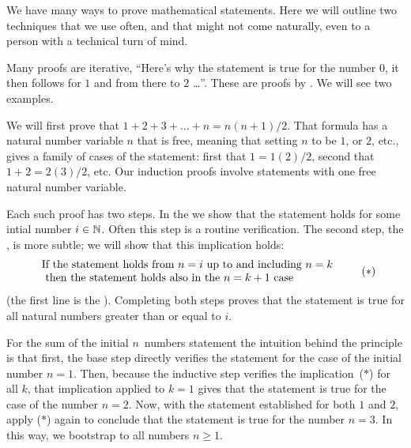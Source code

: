 %
We have many ways to prove mathematical statements.
Here we will outline two techniques that we use often, and that
might not come naturally, even to a person with a technical 
turn of mind.
 

Many proofs are iterative,
``Here's why the statement is true for the number \( 0 \), 
it then follows for \( 1 \) and from there to \( 2 \) \ldots''.
These are proofs by 
.
We will see two examples.

We will first prove that \( 1+2+3+\dots+n=n(n+1)/2 \). 
That formula has a natural number variable $n$
that is free, meaning that setting $n$ to be $1$,
or $2$, etc., gives a family of cases of the statement:
first that $1=1(2)/2$, second that $1+2=2(3)/2$, etc.
Our induction proofs involve statements with one free natural number 
variable.

Each such proof has two steps. 
In the 
we show that the statement holds for
some intial number $i\in \mathbb{N}$. 
Often this step is a routine verification.
The second step, 
the ,
is more subtle; we will show that this implication holds:
\begin{equation*}
  \begin{tabular}{l}
    \text{If the statement holds from $n=i$ up to and including~$n=k$} 
     \\
    \text{\ then the statement holds also in the $n=k+1$ case}
  \end{tabular}
  \tag{$*$}
\end{equation*}
(the first line is the 
).
Completing both steps proves that the statement is
true for all natural numbers greater than or equal to $i$.

For the sum of the initial $n$~numbers statement  
the intuition behind the principle is that first, the base step directly 
verifies the statement for the case of the initial number $n=1$. 
Then, because the inductive step verifies the implication~($*$)
for all $k$, that implication applied to $k=1$
gives that the statement is true for the case of the number
$n=2$. 
Now, with the statement established for both $1$ and $2$, 
apply ($*$) again to conclude that the statement is true for the number
$n=3$.
In this way, we bootstrap to all numbers $n\geq 1$. 


